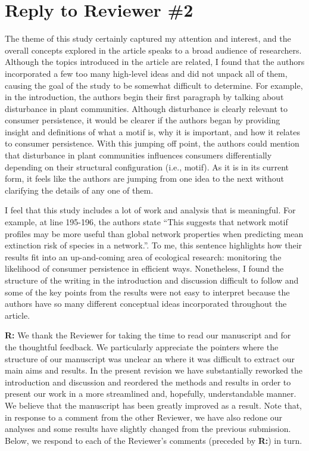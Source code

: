 \documentclass[12pt]{article}
\newenvironment{refquote}{\bigskip \begin{it}}{\end{it}\medskip}
\begin{document}
\clearpage

\section*{Reply to Reviewer \#2}

    \begin{refquote}

        The theme of this study certainly captured my attention and interest, and the overall concepts explored in the article speaks to a broad audience of researchers. Although the topics introduced in the article are related, I found that the authors incorporated a few too many high-level ideas
        and did not unpack all of them, causing the goal of the study to be somewhat difficult to determine. For example, in the introduction, the authors begin their first paragraph by talking about disturbance in plant communities. Although disturbance is clearly relevant to consumer persistence, it would be clearer if the authors began by providing insight and definitions of what a motif is, why it is important, and how it relates to consumer persistence. With this jumping off point, the authors could mention that disturbance in plant communities influences consumers differentially depending on their structural configuration (i.e., motif). As it is in its current form, it feels like the authors are jumping from one idea to the next without clarifying the details of any one of them.

        I feel that this study includes a lot of work and analysis that is meaningful. For example, at line 195-196, the authors state “This suggests that network motif profiles may be more useful than global network properties when predicting mean extinction risk of species in a network.”. To me, this sentence highlights how their results fit into an up-and-coming area of ecological research: monitoring the likelihood of consumer persistence in efficient ways. Nonetheless, I found the structure of the writing in the introduction and discussion difficult to follow and some of the key points from the results were not easy to interpret because the authors have so many different conceptual ideas incorporated throughout the article.

    \end{refquote}


    \textbf{R:} We thank the Reviewer for taking the time to read our manuscript and for the thoughtful feedback. We particularly appreciate the pointers where the structure of our manuscript was unclear an where it was difficult to extract our main aims and results. In the present revision we have substantially reworked the introduction and discussion and reordered the methods and results in order to present our work in a more streamlined and, hopefully, understandable manner. We believe that the manuscript has been greatly improved as a result. Note that, in response to a comment from the other Reviewer, we have also redone our analyses and some results have slightly changed from the previous submission. Below, we respond to each of the Reviewer's comments (preceded by \textbf{R:}) in turn.
\end{document}

